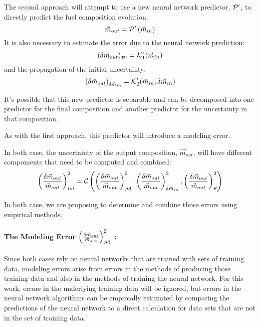 \documentclass[dvips,12pt]{article}
\newcommand{\unc}[1]
{ \delta #1 }
\newcommand{\uncratio}[1]
{ \left(\frac{\unc{#1}}{#1}\right) }
\newcommand{\uncratiosq}[1]
{ \uncratio{#1}^2 }
\begin{document}
The second approach will attempt to use a new
neural network predictor, ${\cal P^\prime}$, to
directly predict the fuel composition evolution:
\begin{equation}
  \vec{m}_{out} = {\cal P^\prime}\left( \vec{m}_{in}\right)
\end{equation}
It is also necessary to estimate the error due to
the neural network prediction:
\begin{equation}
  \left(\unc{\vec{m}_{out}}\right)_{\cal P^\prime} = {\cal K}_1^{\prime}(\vec{m}_{in})
\end{equation}
and the propagation of the initial uncertainty:
\begin{equation}
  \left(\unc{\vec{m}_{out}}\right)_{\unc{\vec{m}_{in}}} = {\cal K}^{\prime}_2(\vec{m}_{in}, \unc{\vec{m}_{in}})
\end{equation}



It's possible that this new predictor is separable
and can be decomposed into one predictor for the
final composition and another predictor for the
uncertainty in that composition.

As with the first approach, this predictor will
introduce a modeling error.

In both case, the uncertainty of the output
composition, $\vec{m}_{out}$, will have different
compoments that need to be computed and combined:
\begin{equation}
  \uncratiosq{\vec{m}_{out}}_{tot} =
  {\cal C}\left(  \uncratiosq{\vec{m}_{out}} _{\cal M},
                  \uncratiosq{\vec{m}_{out}} _{\delta \vec{m}_{in}},
                  \uncratiosq{\vec{m}_{out}} _{\vec{\tau}}
         \right)
\end{equation}

In both case, we are proposing to determine and
combine those errors using empirical methods.

\paragraph{The Modeling Error $\uncratiosq{\vec{m}_{out}} _{\cal M}$ : \\}

Since both cases rely on neural networks that are
trained with sets of training data, modeling
errors arise from errors in the methods of
producing those training data and also in the
methods of training the neural network.  For this
work, errors in the underlying training data will
be ignored, but errors in the neural network
algorithms can be empircally estimated by
comparing the predictions of the neural network to
a direct calculation for data sets that are not in
the set of training data.
\end{document}
